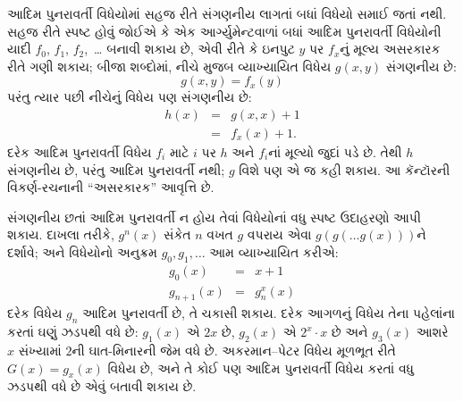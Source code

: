 \documentclass[../../../include/open-logic-section]{subfiles}
\begin{document}

આદિમ પુનરાવર્તી વિધેયોમાં સહજ રીતે સંગણનીય લાગતાં બધાં વિધેયો
સમાઈ જતાં નથી. સહજ રીતે સ્પષ્ટ હોવું જોઈએ કે એક આર્ગ્યુમેન્ટવાળાં
બધાં આદિમ પુનરાવર્તી વિધેયોની યાદી
$f_0$, $f_1$, $f_2$,~\dots{} બનાવી શકાય છે, એવી રીતે કે ઇનપુટ
$y$ પર $f_x$નું મૂલ્ય અસરકારક રીતે ગણી શકાય; બીજા શબ્દોમાં, નીચે
મુજબ વ્યાખ્યાયિત વિધેય $g(x,y)$ સંગણનીય છે:
\[
g(x,y) = f_x(y)
\]
પરંતુ ત્યાર પછી નીચેનું વિધેય પણ સંગણનીય છે:
\begin{eqnarray*}
h(x) & = & g(x,x) + 1 \\
& = & f_x(x) +1.
\end{eqnarray*}
દરેક આદિમ પુનરાવર્તી વિધેય $f_i$ માટે $i$ પર $h$ અને $f_i$નાં
મૂલ્યો જુદાં પડે છે. તેથી $h$ સંગણનીય છે, પરંતુ આદિમ પુનરાવર્તી
નથી; $g$ વિશે પણ એ જ કહી શકાય. આ કૅન્ટૉરની વિકર્ણ-રચનાની
``અસરકારક'' આવૃત્તિ છે.

સંગણનીય છતાં આદિમ પુનરાવર્તી ન હોય તેવાં વિધેયોનાં વધુ સ્પષ્ટ
ઉદાહરણો આપી શકાય. દાખલા તરીકે, $g^n(x)$ સંકેત $n$ વખત $g$
વપરાય એવા $g(g(\dots g(x)))$ને દર્શાવે; અને વિધેયોનો અનુક્રમ
$g_0,g_1,\dots$ આમ વ્યાખ્યાયિત કરીએ:
\begin{eqnarray*}
g_0(x) & = & x+1 \\
g_{n + 1}(x) & = & g_n^x(x)
\end{eqnarray*}
દરેક વિધેય $g_n$ આદિમ પુનરાવર્તી છે, તે ચકાસી શકાય. દરેક
આગળનું વિધેય તેના પહેલાંના કરતાં ઘણું ઝડપથી વધે છે: $g_1(x)$ એ
$2x$ છે, $g_2(x)$ એ $2^x \cdot x$ છે અને $g_3(x)$ આશરે $x$
સંખ્યામાં $2$ની ઘાત-મિનારની જેમ વધે છે. અકરમાન--પેટર વિધેય
મૂળભૂત રીતે $G(x) = g_x(x)$ વિધેય છે, અને તે કોઈ પણ આદિમ
પુનરાવર્તી વિધેય કરતાં વધુ ઝડપથી વધે છે એવું બતાવી શકાય છે.
\end{document}
